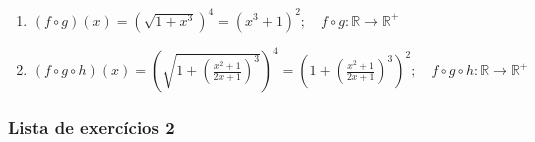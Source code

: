 \documentclass{../sftex/sftex}
\begin{document}
\begin{enumerate}
    \begin{enumerate}
        \item $(f \circ g)(x) = {(\sqrt{1+x^3})}^4 = {(x^3 + 1)}^2; \quad
            f \circ g : \mathbb{R} \rightarrow \mathbb{R}^{+}$

        \item $(f \circ g \circ h)(x)
            = {\left(\sqrt{1 + {(\frac{x^2 + 1}{2x + 1})}^3}\right)}^4
            = {\left(1 + {(\frac{x^2 + 1}{2x + 1})}^3\right)}^2; \quad
            f \circ g \circ h : \mathbb{R} \rightarrow \mathbb{R}^{+}$
    \end{enumerate}
\end{enumerate}

\newpage

\subsubsection*{Lista de exercícios 2}
\end{document}
